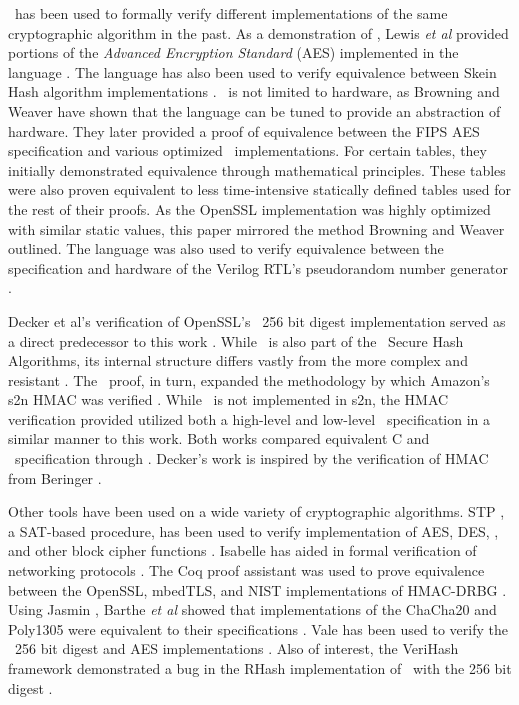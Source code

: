 \cryptol\ has been used to formally verify different implementations of the same cryptographic algorithm in the past.
As a demonstration of \cryptol, Lewis \emph{et al} provided portions of the \emph{Advanced Encryption Standard} (AES) implemented in the language \cite{crypt-hi}.
The language has also been used to verify equivalence between Skein Hash algorithm implementations \cite{hard-soft}.
\cryptol\ is not limited to hardware, as Browning and Weaver \cite{design-verif} have shown that the language can be tuned to provide an abstraction of hardware.
They later provided a proof of equivalence between the FIPS AES specification and various optimized \cryptol\ implementations.
For certain tables, they initially demonstrated equivalence through mathematical principles.
These tables were also proven equivalent to less time-intensive statically defined tables used for the rest of their proofs.
As the OpenSSL implementation was highly optimized with similar static values, this paper mirrored the method Browning and Weaver outlined.
The language was also used to verify equivalence between the specification and hardware of the Verilog RTL's pseudorandom number generator \cite{pseudorandom}.

Decker et al's verification of OpenSSL's \shaTwo\ 256 bit digest implementation served as a direct predecessor to this work \cite{nfm-us}.
While \shaTwo\ is also part of the \nist\ Secure Hash Algorithms, its internal structure differs vastly from the more complex and resistant \shaThree.
The \shaTwo\ proof, in turn, expanded the methodology by which Amazon's s2n HMAC was verified \cite{chudnov,s2n-blog}.
While \shaThree\ is not implemented in s2n, the HMAC verification provided utilized both a high-level and low-level \cryptol\ specification in a similar manner to this work.
Both works compared equivalent C and \cryptol\ specification through \saw.
Decker's work is inspired by the \openssl verification of HMAC from Beringer \cite{beringer}.

Other tools have been used on a wide variety of cryptographic algorithms.
STP \cite{stp}, a SAT-based procedure, has been used to verify implementation of AES, DES, \shaOne, and other block cipher functions \cite{auto}.
Isabelle has aided in formal verification of networking protocols \cite{isabelle,formal-protocols}.
The Coq proof assistant was used to prove equivalence between the OpenSSL, mbedTLS, and NIST implementations of HMAC-DRBG \cite{coq,verified-correctness}.
Using Jasmin \cite{jasmin}, Barthe \emph{et al} showed that implementations of the ChaCha20 and Poly1305 were equivalent to their specifications \cite{hi-assurance}.
Vale has been used to verify the \shaTwo\ 256 bit digest and AES implementations \cite{vale}.
Also of interest, the VeriHash framework demonstrated a bug in the RHash implementation of \shaThree\ with the 256 bit digest \cite{rhash,hash-functions}.
